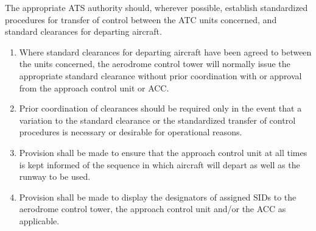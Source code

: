 \begin{enumeratesc}
    \begin{enumempty}
        \item The appropriate ATS authority should, wherever possible, establish standardized procedures for transfer of control between the ATC units concerned, and standard clearances for departing aircraft.
    \end{enumempty}

    \begin{enumerate}
        \item Where standard clearances for departing aircraft have been agreed to between the units concerned, the aerodrome control tower will normally issue the appropriate standard clearance without prior coordination with or approval from the approach control unit or ACC.
        \item Prior coordination of clearances should be required only in the event that a variation to the standard clearance or the standardized transfer of control procedures is necessary or desirable for operational reasons.
        \item Provision shall be made to ensure that the approach control unit at all times is kept informed of the sequence in which aircraft will depart as well as the runway to be used.
        \item Provision shall be made to display the designators of assigned SIDs to the aerodrome control tower, the approach control unit and/or the ACC as applicable.
    \end{enumerate}


\end{enumeratesc}
